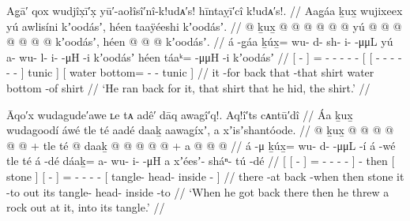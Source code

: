 
\ex\label{ex:91-207-ran-back-for-shirt}%
%
\begingl
	\glpreamble	Ag̣ā′ qox wudjîx̣ī′x̣ yū′-aołîsî′nî-k!udᴀ′s! hīntaỵī′cî k!udᴀ′s!. //
	\glpreamble	Aag̱áa ḵux̱ wujixeex yú awlisíni kʼoodásʼ, héen taaÿéeshi kʼoodásʼ. //
	\gla	{}  @ {} {}
		ḵux̱ @  @ {} @ {} @ {} @ {} @ {}
		{} yú {}  @ {} @ {} @ {} @ {} @ {} @ {} @ {} kʼoodásʼ, {}
		{} héen  @ {} @ {} @ {} kʼoodásʼ. {} //
	\glb	{} á -g̱áa {}
		ḵúx̱= wu- d- sh- i-  -μμL
		{} yú {} a- wu- l- i-  -μH -i {} kʼoodásʼ {}
		{} héen táaᵏ=  -μμH -i kʼoodásʼ {} //
	\glc	{}[  - {}]
		= - - - -  -
		{}[ 
			{}[ - - - -
				 - - {}] tunic {}]
		{}[ water bottom=  - - tunic {}] //
	\gld	{} it -for {}
		back  {} {} {} {} {}
		{} that {}  {} {} {} {} {} -that {} shirt {}
		{} water bottom  {} -of shirt {} //
	\glft	‘He ran back for it, that shirt that he hid, the  shirt.’
		//
\endgl
\xe

\ex\label{ex:91-208-got-back-threw-rock-out}%
%
\begingl
	\glpreamble	Āqo′x wudagude′awe ʟe tᴀ adê′ dāq awagî′q!. Aq!î′ts cᴀntū′dî //
	\glpreamble	Áa ḵux̱ wudagoodí áwé tle té aadé daaḵ aawag̱íxʼ, a xʼisʼshantóode. //
	\gla	{} {}  @ {} {}
			ḵux̱ @  @ {} @ {} @ {} @ {} {}
		 @ {} +
		tle {} té {}
		{}  @ {} {}
		daaḵ @  @ {} @ {} @ {} @ {} +
		{} a  @ {} @ {} @ {} {} //
	\glb	{} {} á -μ {}
			ḵúx̱= wu- d-  -μμL -í {}
		á -wé
		tle {} té {}
		{} á -dé {}
		dáaḵ= a- wu- i-  -μH
		{} a xʼéesʼ- sháⁿ- tú -dé {} //
	\glc	{}[ {}[  - {}]
			= - -
				 - - {}]
		 -
		then {}[ stone {}]
		{}[  - {}]
		= - - -  -
		{}[  tangle- head- inside - {}] //
	\gld	{} {} there -at {}
			back  {} {} {} -when {}
		 {}
		then {} stone {}
		{} it -to {}
		out  {} {} {} {}
		{} its tangle- head- inside -to {} //
	\glft	‘When he got back there then he threw a rock out at it, into its tangle.’
		//
\endgl
\xe


